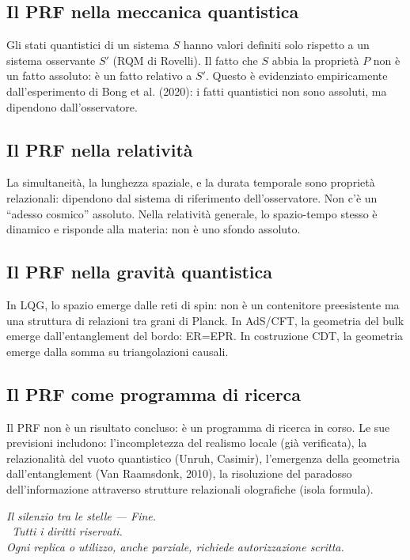 \documentclass[11.5pt,a4paper,openany]{book}
\theoremstyle{remark}
\begin{document}
\subsection{Il PRF nella meccanica quantistica}
Gli stati quantistici di un sistema $S$ hanno valori definiti solo rispetto a un sistema osservante $S'$ (RQM di Rovelli). Il fatto che $S$ abbia la proprietà $P$ non è un fatto assoluto: è un fatto relativo a $S'$. Questo è evidenziato empiricamente dall'esperimento di Bong et al. (2020): i fatti quantistici non sono assoluti, ma dipendono dall'osservatore.

\subsection{Il PRF nella relatività}
La simultaneità, la lunghezza spaziale, e la durata temporale sono proprietà relazionali: dipendono dal sistema di riferimento dell'osservatore. Non c'è un ``adesso cosmico'' assoluto. Nella relatività generale, lo spazio-tempo stesso è dinamico e risponde alla materia: non è uno sfondo assoluto.

\subsection{Il PRF nella gravità quantistica}
In LQG, lo spazio emerge dalle reti di spin: non è un contenitore preesistente ma una struttura di relazioni tra grani di Planck. In AdS/CFT, la geometria del bulk emerge dall'entanglement del bordo: ER=EPR. In costruzione CDT, la geometria emerge dalla somma su triangolazioni causali.

\subsection{Il PRF come programma di ricerca}
Il PRF non è un risultato concluso: è un programma di ricerca in corso. Le sue previsioni includono: l'incompletezza del realismo locale (già verificata), la relazionalità del vuoto quantistico (Unruh, Casimir), l'emergenza della geometria dall'entanglement (Van Raamsdonk, 2010), la risoluzione del paradosso dell'informazione attraverso strutture relazionali olografiche (isola formula).

\vfill
\begin{center}
{\small\itshape\color{captionink}
\textit{Il silenzio tra le stelle} — Fine.\\[0.3em]
\textcopyright\ Tutti i diritti riservati.\\[0.3em]
Ogni replica o utilizzo, anche parziale, richiede autorizzazione scritta.}
\end{center}
\end{document}
